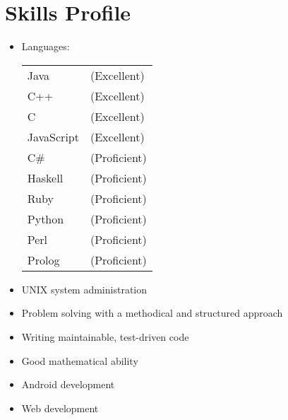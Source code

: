 \section*{Skills Profile}

\begin{itemize}
	\item Languages:

		\begin{tabular}{R{3cm}l}
			Java & (Excellent)\\
			C++ & (Excellent)\\
			C & (Excellent)\\
			JavaScript & (Excellent)\\
			C\# & (Proficient)\\
			Haskell & (Proficient)\\
			Ruby & (Proficient)\\
			Python & (Proficient)\\
			Perl & (Proficient)\\
			Prolog & (Proficient)
		\end{tabular}

	\item UNIX system administration
	\item Problem solving with a methodical and structured approach
	\item Writing maintainable, test-driven code
	\item Good mathematical ability
	\item Android development
	\item Web development
\end{itemize}